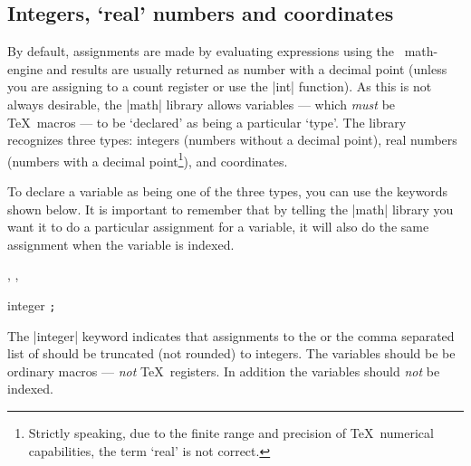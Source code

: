 \subsection{Integers, `real' numbers and coordinates}
	
	By default, assignments are made by evaluating expressions
	using the \pgfname\ math-engine and 
	results	are usually returned as number with a decimal point (unless you
	are assigning to a count register or use the |int| function).
	As this is not always desirable, the |math| library allows
	variables --- which \emph{must} be \TeX\ macros --- to be `declared'
	as being a particular `type'. The library recognizes three types:
	integers (numbers without a decimal point),
	real numbers (numbers with a decimal point\footnote{Strictly speaking, due to the 
	finite range and precision of \TeX\ numerical capabilities, the term `real' is
	not correct.}), and coordinates.
	
	To declare a variable as being one of the three types,
	you  can use the keywords shown below. It is important to remember
	that by telling the |math| library you want it to do a
	particular assignment for a variable, it will also do the same 
	assignment when the variable is indexed.
	
\begin{codeexample}[]
, , 
\end{codeexample}



\begin{math-keyword}{{integer} \texttt{;}}

	The |integer| keyword indicates that assignments to the  or 
	the comma separated list of  should be 
	truncated (not rounded) to integers. The variables should be be ordinary 
	macros --- \emph{not} \TeX\ registers. In addition the variables
	should \emph{not} be indexed. 

\begin{codeexample}[]
\end{codeexample}

\end{math-keyword}

